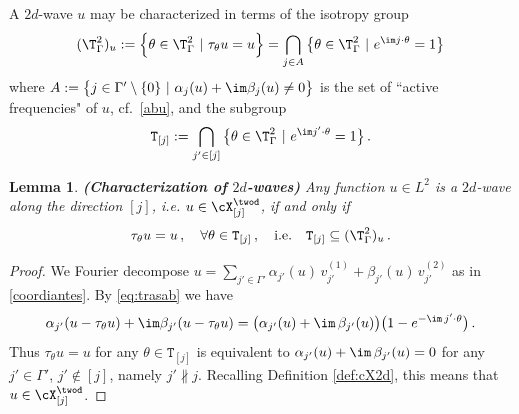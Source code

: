 \documentclass[11pt,a4paper,reqno]{article}
\numberwithin{equation}{section}
\newtheorem{lemma}[theorem]{Lemma}
\theoremstyle{definition}
\begin{document}
 
A $2d$-wave $ u  $ 
may be characterized  
 in terms of the isotropy group 
\begin{equation}\label{stabilu}
            (\T_\Gamma^2)_u := 
            \Big\{ \theta \in \T^2_\Gamma \ |\ \tau_\theta u= u  \Big\}
            = 
            \bigcap_{j \in A} 
            \big\{ \theta \in 
            \T^2_\Gamma \ |\ e^{\im j \cdot \theta } = 1 \big\}
\end{equation}
    where $ A := \big\{ j \in \Gamma' \setminus \{0\} \ | \ \alpha_j (u) + \im \beta_j (u)\neq 0    \big\}  $ is the set of ``active frequencies" of $ u  $, 
cf.~\eqref{abu}, 
and  the subgroup    \begin{equation}\label{eq:def H[j]}
        {\mathtt T}_{[j]}:= 
        \bigcap_{j'\in [j]}\big\{\theta\in \T^2_\Gamma
        \ | \ e^{\im j'\cdot \theta}=1\big\} 
        \, .
    \end{equation}
     \begin{lemma}\label{ortoges}
    {\bf (Characterization of $2d$-waves)}
    Any function 
            $u \in L^2  $ is a 
            $ 2 d$-wave along the direction $ [j] $, i.e.  $ u\in \cX_{[j]}^{\twod} $, if and only if 
    \begin{equation}\label{One dimensional iff simmetric}
         \tau_\theta u=u \, , \quad \forall \theta\in 
                {\mathtt T}_{[j]} \, , \quad \text{i.e.} \quad {\mathtt T}_{[j]}\subseteq (\T_\Gamma^2)_u\, .
            \end{equation}
    \end{lemma}
    
    \begin{proof}
    We Fourier  decompose 
$
    u=\sum_{j'\in \Gamma'} \alpha_{j'}(u)\, v_{j'}^{(1)}+\beta_{j'}(u)\, v_{j'}^{(2)} $
    as in 
    \eqref{coordiantes}.    
By \eqref{eq:trasab}
we have 
$$
            \alpha_{j'}(u-\tau_\theta u)+\im \beta_{j'}(u-\tau_\theta u)=\big(\alpha_{j'}(u)+\im \, \beta_{j'}(u)\big)\big(1-e^{-\im \, {j'}\cdot \theta}\big) \, . 
$$
        Thus $\tau_\theta u=u$ for any $\theta\in {\mathtt T}_{[j]}$ is equivalent to   
        $
            \alpha_{j'}(u)+\im \, \beta_{j'}(u)=0
      $  
        for any $ j' \in \Gamma' $, $j'\not\in [j]$, namely  $ j' \not \parallel j $.
        Recalling  
        Definition \ref{def:cX2d}, this means that 
        $ u \in \cX_{[j]}^{\twod} $.
    \end{proof}
    
\end{document}
